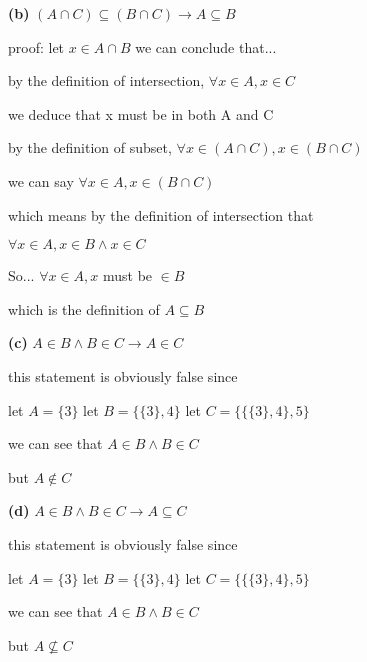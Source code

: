 \documentclass[12pts,A4]{article}
\begin{document}
\begin{flushleft}
    \textbf{(b)} $(A \cap C ) \subseteq (B \cap C) \rightarrow A \subseteq B$

    proof:
    \bigskip
    let $x \in A \cap B$
    we can conclude that... 
    \bigskip
    
    by the definition of intersection, $\forall x \in A, x \in C$
    
    we deduce that x must be in both A and C 

    \bigskip

    by the definition of subset, $\forall x \in (A \cap C), x \in (B \cap C)$

    
    we can say $\forall x \in A, x \in (B \cap C)$

    \bigskip
    which means by the definition of intersection that 

    $\forall x \in A, x \in B \wedge x\in C$

    So... $\forall x \in A, x$ must be $\in B$

    which is the definition of $ A \subseteq B $





\end{flushleft}


\begin{flushleft}
   \textbf{(c)} $A \in B \wedge B \in C \rightarrow A \in C$ 
    
    this statement is obviously false since

    let $ A = \{ 3 \}$
    let $ B = \{ \{ 3 \}, 4 \}$
    let $ C = \{ \{ \{ 3 \}, 4 \}, 5 \}$

    \bigskip

    we can see that $A \in B \wedge B \in C$

    but $A \not\in C$



\end{flushleft}


\begin{flushleft}
   \textbf{(d)} $A \in B \wedge B \in C \rightarrow A \subseteq C$ 
    
    this statement is obviously false since

    let $ A = \{ 3 \}$
    let $ B = \{ \{ 3 \}, 4 \}$
    let $ C = \{ \{ \{ 3 \}, 4 \}, 5 \}$

    \bigskip

    we can see that $A \in B \wedge B \in C$

    but $A \not\subseteq C$



\end{flushleft}
\end{document}

